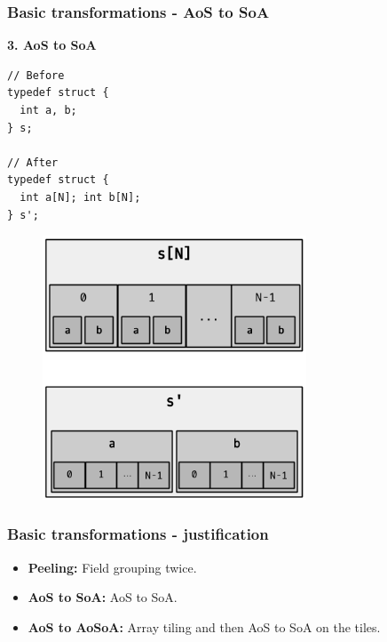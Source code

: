 \begin{frame}[fragile]
\frametitle{Basic transformations - AoS to SoA}

\begin{center}
\begin{minipage}{0.3\linewidth}
\textbf{\small 3. AoS to SoA}
\begin{lstlisting}[style=Cstyle, basicstyle=\scriptsize]
// Before
typedef struct {
  int a, b;
} s;

// After
typedef struct {
  int a[N]; int b[N];
} s';
\end{lstlisting}
\end{minipage}%
\begin{minipage}{0.5\linewidth}
\begin{figure}
	\centering
	\includegraphics[width=0.7\textwidth]{images/soa}
\end{figure}
\end{minipage}
\end{center}

\end{frame}



\begin{frame}[fragile]
\frametitle{Basic transformations - justification}

\begin{itemize}
	\setlength\itemsep{1.5em}
	\item \textbf{Peeling:} Field grouping twice. %
	\item \textbf{AoS to SoA:} AoS to SoA. %
	\item \textbf{AoS to AoSoA:} Array tiling and then AoS to SoA on the tiles.
\end{itemize}

\end{frame}


